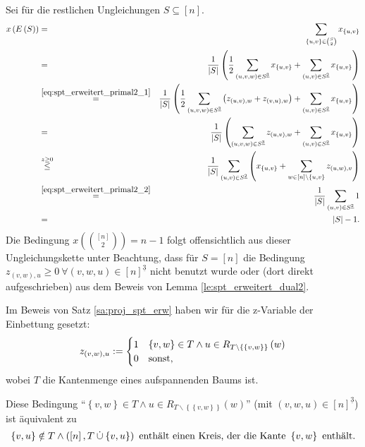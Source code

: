 \documentclass[10p,a4paper,BCOR = 12mm, DIV=15]{scrbook}
\begin{document}
\begin{bew}
Sei für die restlichen Ungleichungen $S\subseteq \left[n\right]$.
{
\allowdisplaybreaks
\begin{eqnarray*}
x\left(E\left(S\right)\right) & = & \sum_{\left\{u, v\right\} \in {S \choose 2}} x_{\left\{u, v\right\}} \\
& = & \frac{1}{\left|S\right|} \left(\frac{1}{2} \sum_{\left(u, v, w\right) \in S^{\underline{3}}} x_{\left\{u, v\right\}} + \sum_{\left(u, v\right) \in S^{\underline{2}}} x_{\left\{u, v\right\}} \right) \\
& \stackrel{\eqref{eq:spt_erweitert_primal2_1}}{=} & \frac{1}{\left|S\right|} \left(\frac{1}{2} \sum_{\left(u, v, w\right) \in S^{\underline{3}}} \left(z_{\left(u, v\right), w} + z_{\left(v, u\right), w}\right) + \sum_{\left(u, v\right) \in S^{\underline{2}}} x_{\left\{u, v\right\}} \right) \\
& = & \frac{1}{\left|S\right|} \left(\sum_{\left(u, v, w\right) \in S^{\underline{3}}} z_{\left(u, v\right), w} + \sum_{\left(u, v\right) \in S^{\underline{2}}} x_{\left\{u, v\right\}} \right) \\
& \stackrel{z \geq 0}{\leq} & \frac{1}{\left|S\right|} \sum_{\left(u, v\right) \in S^{\underline{2}}} \left( x_{\left\{u, v\right\}} + \sum_{w \in \left[n\right] \backslash \left\{u, v\right\}} z_{\left(u, w\right), v} 
\right) \\
& \stackrel{\eqref{eq:spt_erweitert_primal2_2}}{=} & \frac{1}{\left|S\right|} \sum_{\left(u, v\right) \in S^{\underline{2}}} 1 \\
& = & \left|S\right|-1.
\end{eqnarray*}
}
Die Bedingung $x\left({\left[n\right] \choose 2}\right) = n-1$ folgt offensichtlich aus dieser Ungleichungskette unter Beachtung, dass für $S=\left[n\right]$ die Bedingung $z_{\left(v, w\right), u} \geq 0 \ \forall \left(v, w, u\right) \in \left[n\right]^{\underline{3}}$ nicht benutzt wurde oder (dort direkt aufgeschrieben) aus dem Beweis von Lemma \ref{le:spt_erweitert_dual2}.
\end{bew}

\begin{Bem}
Im Beweis von Satz \ref{sa:proj_spt_erw} haben wir für die z-Variable der Einbettung gesetzt:
\begin{displaymath}
z_{\left(v, w\right), u} := \begin{cases}
1 & \left\{v, w\right\}\in T\wedge u\in R_{T\backslash \left\{\left\{v, w\right\}\right\}}\left(w\right) \\
0 & \textnormal{sonst,}
\end{cases}
\end{displaymath}
wobei $T$ die Kantenmenge eines aufspannenden Baums ist.

Diese Bedingung "`$\left\{v, w\right\}\in T \wedge u\in R_{T\backslash \left\{\left\{v, w\right\}\right\}}\left(w\right)$"' (mit $\left(v, w, u\right) \in \left[n\right]^{\underline{3}}$) ist äquivalent zu
\begin{displaymath}
\left\{v, u\right\}\notin T\wedge\left(\left[n\right], T \mathbin{\dot{\cup}} \left\{v, u\right\}\right)\textnormal{ enthält einen Kreis, der die Kante }\left\{v, w\right\}\textnormal{ enthält}.
\end{displaymath} 
\end{Bem}
\end{document}
